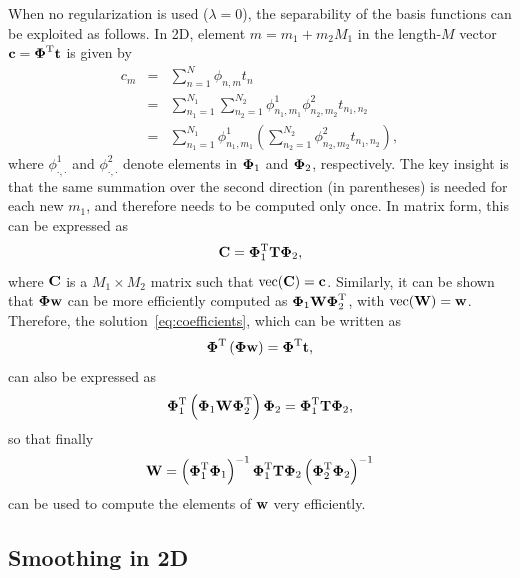 \documentclass[10pt,twoside]{book}
\begin{document}
When no regularization is used ($\lambda = 0$), 
the separability of the basis functions can be exploited
as follows.
%
%
In 2D, element $m=m_1 + m_2 M_1$ in the length-$M$ vector $\mathbf{c} = {\mbox{\boldmath {${\Phi}$}}}^\mathrm{T} \mathbf{t}$ is given by
\begin{eqnarray*}
c_m 
& = &
\sum_{n=1}^{N} \phi_{n,m} t_n 
\\
& = & 
\sum_{n_1=1}^{N_1}
\sum_{n_2=1}^{N_2}
\phi_{n_1,m_1}^1 
\phi_{n_2,m_2}^2 
t_{n_1,n_2}
\\
& = & 
\sum_{n_1=1}^{N_1}
\phi_{n_1,m_1}^1 
\left(
\sum_{n_2=1}^{N_2}
\phi_{n_2,m_2}^2 
t_{n_1,n_2}
\right)
,
\end{eqnarray*}
where 
$\phi_{\cdot,\cdot}^1$ and 
$\phi_{\cdot,\cdot}^2$ denote elements in ${\mbox{\boldmath {${\Phi}$}}}_1$ and ${\mbox{\boldmath {${\Phi}$}}}_2$, respectively.
The key insight is that the same summation over the second direction (in parentheses) is needed for each 
new $m_1$,
and therefore needs to be computed only once. In matrix form, this can be expressed as 
$$
\mathbf{C} = {\mbox{\boldmath {${\Phi}$}}}_1^\mathrm{T} \mathbf{T} {\mbox{\boldmath {${\Phi}$}}}_2,
$$
where $\mathbf{C}$ is a $M_1 \times M_2$ matrix such that $\mathrm{vec}( \mathbf{C} ) = \mathbf{c}$.
Similarly, it can be shown that ${\mbox{\boldmath {${\Phi}$}}} \mathbf{w}$ can be more efficiently computed as ${\mbox{\boldmath {${\Phi}$}}}_1 \mathbf{W} {\mbox{\boldmath {${\Phi}$}}}_2^\mathrm{T}$, with $\mathrm{vec}( \mathbf{W} ) = \mathbf{w}$.
Therefore, the solution~\eqref{eq:coefficients}, which can be written as
$$
{\mbox{\boldmath {${\Phi}$}}}^\mathrm{T} 
\left(
{\mbox{\boldmath {${\Phi}$}}}
\mathbf{w}
\right)
=
{\mbox{\boldmath {${\Phi}$}}}^\mathrm{T} \mathbf{t}
,
$$
can also be expressed as 
$$
{\mbox{\boldmath {${\Phi}$}}}_1^\mathrm{T}
\left(
{\mbox{\boldmath {${\Phi}$}}}_1\mathbf{W}{\mbox{\boldmath {${\Phi}$}}}_2^\mathrm{T} 
\right)
{\mbox{\boldmath {${\Phi}$}}}_2
=
{\mbox{\boldmath {${\Phi}$}}}_1^\mathrm{T}
\mathbf{T}
{\mbox{\boldmath {${\Phi}$}}}_2
,
$$
so that finally 
\begin{equation}
\mathbf{W} = 
\left( 
{\mbox{\boldmath {${\Phi}$}}}_1^\mathrm{T}
{\mbox{\boldmath {${\Phi}$}}}_1
\right)^{-1}
{\mbox{\boldmath {${\Phi}$}}}_1^\mathrm{T}
\mathbf{T}
{\mbox{\boldmath {${\Phi}$}}}_2
\left( 
{\mbox{\boldmath {${\Phi}$}}}_2^\mathrm{T}
{\mbox{\boldmath {${\Phi}$}}}_2
\right)^{-1}
\label{eq:solution2D}
\end{equation}
can be used to compute the elements of $\mathbf{w}$ very efficiently.


\subsection{Smoothing in 2D}
\end{document}
